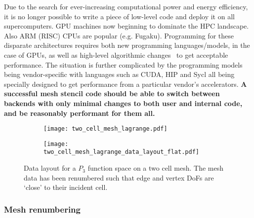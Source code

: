 \documentclass[thesis]{subfiles}
\begin{document}

Due to the search for ever-increasing computational power and energy efficiency, it is no longer possible to write a piece of low-level code and deploy it on all supercomputers.
GPU machines now beginning to dominate the HPC landscape.
Also ARM (RISC) CPUs are popular (e.g. Fugaku).
Programming for these disparate architectures requires both new programming languages/models, in the case of GPUs, as well as high-level algorithmic changes~\cite{betteridgeCodeGenerationProductive2021} to get acceptable performance.
The situation is further complicated by the programming models being vendor-specific with languages such as CUDA, HIP and Sycl all being specially designed to get performance from a particular vendor's accelerators.
\textbf{A successful mesh stencil code should be able to switch between backends with only minimal changes to both user and internal code, and be reasonably performant for them all.}

\begin{figure}
  \centering
  \begin{subfigure}{\textwidth}
    \centering
    \texttt{[image: two\_cell\_mesh\_lagrange.pdf]}
    \vspace{1em}
  \end{subfigure}
  \begin{subfigure}{\textwidth}
    \centering
    \texttt{[image: two\_cell\_mesh\_lagrange\_data\_layout\_flat.pdf]}
  \end{subfigure}
  \caption{
    Data layout for a $P_3$ function space on a two cell mesh.
    The mesh data has been renumbered such that edge and vertex DoFs are `close' to their incident cell.
  }
  \label{fig:mesh_renumbering_demo}
\end{figure}

\subsubsection{Mesh renumbering}
\end{document}
